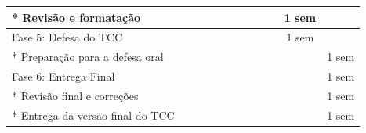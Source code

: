 \begin{table}[htbp]
\begin{tabular}{|p{4.7cm}|c|c|c|c|c|c|c|c|c|c|c|}
\hline
* Revis\~ao e formata\c{c}\~ao & & & & & & & & & & 1 sem & \\
\hline
Fase 5: Defesa do TCC & & & & & & & & & & 1 sem & \\
\hline
* Prepara\c{c}\~ao para a defesa oral & & & & & & & & & & & 1 sem \\
\hline
Fase 6: Entrega Final & & & & & & & & & & & 1 sem \\
\hline
* Revis\~ao final e corre\c{c}\~oes & & & & & & & & & & & 1 sem \\
\hline
* Entrega da vers\~ao final do TCC & & & & & & & & & & & 1 sem \\
\hline
\end{tabular}
\end{table}
